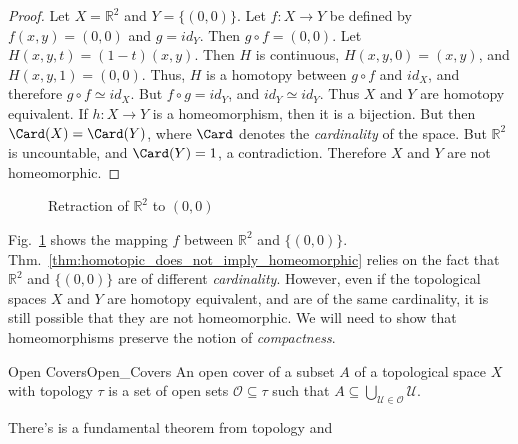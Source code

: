 \documentclass[crop=false,class=book,oneside]{standalone}                      %
\begin{document}
            \begin{proof}
                Let $X=\mathbb{R}^{2}$ and $Y=\{(0,0)\}$.
                Let $f:{X}\rightarrow{Y}$ be defined by
                $f(x,y)=(0,0)$ and $g=id_{Y}$. Then
                $g\circ{f}=(0,0)$. Let $H(x,y,t)=(1-t)(x,y)$.
                Then $H$ is continuous, $H(x,y,0)=(x,y)$,
                and $H(x,y,1)=(0,0)$. Thus, $H$ is a
                homotopy between ${g}\circ{f}$ and $id_{X}$, and
                therefore ${g}\circ{f}\simeq{id_{X}}$. But
                ${f}\circ{g}=id_{Y}$, and ${id_{Y}}\simeq{id_{Y}}$.
                Thus $X$ and $Y$ are homotopy equivalent.
                If $h:{X}\rightarrow{Y}$ is a homeomorphism, then it is a
                bijection. But then $\Card(X)=\Card(Y)$,
                where $\Card$ denotes the \textit{cardinality} of the space.
                But $\mathbb{R}^{2}$ is uncountable, and $\Card(Y)=1$,
                a contradiction. Therefore $X$ and $Y$ are not homeomorphic.
            \end{proof}
            \begin{figure}[H]
                \captionsetup{type=figure}
                \centering
                
                \caption{Retraction of $\mathbb{R}^{2}$ to $(0,0)$}
                \label{fig:homotopy_equivalence_of_plane_with_point}
            \end{figure}
            Fig.~\ref{fig:homotopy_equivalence_of_plane_with_point}
            shows the mapping $f$ between $\mathbb{R}^{2}$ and $\{(0,0)\}$.
            Thm.~\ref{thm:homotopic_does_not_imply_homeomorphic} relies on the
            fact that $\mathbb{R}^{2}$ and $\{(0,0)\}$ are of different
            \textit{cardinality}. However, even if the topological spaces $X$
            and $Y$ are homotopy equivalent, and are of the same cardinality,
            it is still possible that they are not homeomorphic. We will need
            to show that homeomorphisms preserve the notion of
            \textit{compactness}.
            \begin{ldefinition}{Open Covers}{Open_Covers}
                An open cover of a subset $A$ of a topological space $X$ with
                topology $\tau$ is a set of open sets
                $\mathcal{O}\subseteq\tau$ such that
                $A\subseteq\bigcup_{\mathcal{U}\in\mathcal{O}}\mathcal{U}$.
            \end{ldefinition}
            There's is a fundamental theorem from topology and
\end{document}

